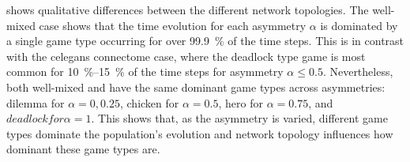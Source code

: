\documentclass[pdflatex,lineno,referee,sn-mathphys-ay]{sn-jnl}
\begin{document}
 shows qualitative differences
between the different network topologies.
The  well-mixed case
shows that the time evolution for each asymmetry $\alpha$
is dominated by a single game type
occurring for over \SI{99.9}{\percent} of the time steps.
This is in contrast with the
 \gls{celegans} connectome case,
where the deadlock type game is most common
for \SIrange{10}{15}{\percent} of the time steps
for asymmetry $\alpha \le 0.5$.
Nevertheless, both  well-mixed
and  have the same dominant game types
across asymmetries:
dilemma for $\alpha = 0, 0.25$, chicken for $\alpha = 0.5$,
hero for $\alpha = 0.75$, and $deadlock for \alpha = 1$.
This shows that, as the asymmetry is varied,
different game types dominate the population's evolution
and network topology influences how dominant these game types are.
\end{document}
